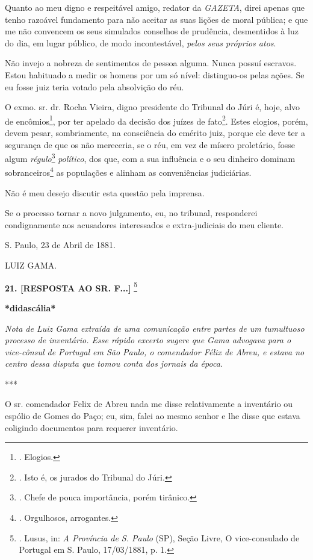 Quanto ao meu digno e respeitável amigo, redator da \emph{GAZETA}, direi
apenas que tenho razoável fundamento para não aceitar as suas lições de
moral pública; e que me não convencem os seus simulados conselhos de
prudência, desmentidos à luz do dia, em lugar público, de modo
incontestável, \emph{pelos seus próprios atos}.

Não invejo a nobreza de sentimentos de pessoa alguma. Nunca possuí
escravos. Estou habituado a medir os homens por um só nível:
distinguo-os pelas ações. Se eu fosse juiz teria votado pela absolvição
do réu.

O exmo. sr. dr. Rocha Vieira, digno presidente do Tribunal do Júri é,
hoje, alvo de encômios\footnote{. Elogios.}, por ter apelado da decisão
dos juízes de fato\footnote{. Isto é, os jurados do Tribunal do Júri.}.
Estes elogios, porém, devem pesar, sombriamente, na consciência do
emérito juiz, porque ele deve ter a segurança de que os não mereceria,
se o réu, em vez de mísero proletário, fosse algum
\emph{régulo}\footnote{. Chefe de pouca importância, porém tirânico.}
\emph{político}, dos que, com a sua influência e o seu dinheiro dominam
sobranceiros\footnote{. Orgulhosos, arrogantes.}
as populações e alinham as
conveniências judiciárias.

Não é meu desejo discutir esta questão pela imprensa.

Se o processo tornar a novo julgamento, eu, no tribunal, responderei
condignamente aos acusadores interessados e extra-judiciais do meu
cliente.

S. Paulo, 23 de Abril de 1881.

LUIZ GAMA.

\textbf{21. {[}RESPOSTA AO
SR. F...{]}} \footnote{. Lusus, in: \emph{A Província de S. Paulo} (SP),
  Seção Livre, O vice-consulado de Portugal em S. Paulo, 17/03/1881, p.
  1.}

\textbf{*didascália*}

\emph{Nota de Luiz Gama extraída de uma comunicação entre partes de um
tumultuoso processo de inventário. Esse rápido excerto sugere que Gama
advogava para o vice-cônsul de Portugal em São Paulo, o comendador Félix
de Abreu, e estava no centro dessa disputa que tomou conta dos jornais
da época.}

***

O sr. comendador Felix de Abreu nada me disse relativamente a inventário
ou espólio de Gomes do Paço; eu, sim, falei ao mesmo senhor e lhe disse
que estava coligindo documentos para requerer inventário.

